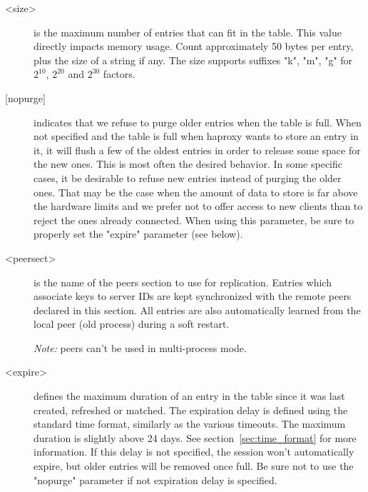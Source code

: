 \begin{description}
  \item[<size>] is the maximum number of entries that can fit in the table. This
               value directly impacts memory usage. Count approximately
               50 bytes per entry, plus the size of a string if any. The size
               supports suffixes "k", "m", "g" for $2^{10}$, $2^{20}$ and $2^{30}$ factors.

  \item[{[nopurge]}] indicates that we refuse to purge older entries when the table
               is full. When not specified and the table is full when haproxy
               wants to store an entry in it, it will flush a few of the oldest
               entries in order to release some space for the new ones. This is
               most often the desired behavior. In some specific cases, it
               be desirable to refuse new entries instead of purging the older
               ones. That may be the case when the amount of data to store is
               far above the hardware limits and we prefer not to offer access
               to new clients than to reject the ones already connected. When
               using this parameter, be sure to properly set the "expire"
               parameter (see below).

  \item[<peersect>] is the name of the peers section to use for replication. Entries
               which associate keys to server IDs are kept synchronized with
               the remote peers declared in this section. All entries are also
               automatically learned from the local peer (old process) during a
               soft restart.

               \emph{Note:} peers can't be used in multi-process mode.

  \item[<expire>] defines the maximum duration of an entry in the table since it
               was last created, refreshed or matched. The expiration delay is
               defined using the standard time format, similarly as the various
               timeouts. The maximum duration is slightly above 24 days. See
               section~\ref{sec:time_format} for more information. If this delay is not specified,
               the session won't automatically expire, but older entries will
               be removed once full. Be sure not to use the "nopurge" parameter
               if not expiration delay is specified.


\end{description}
